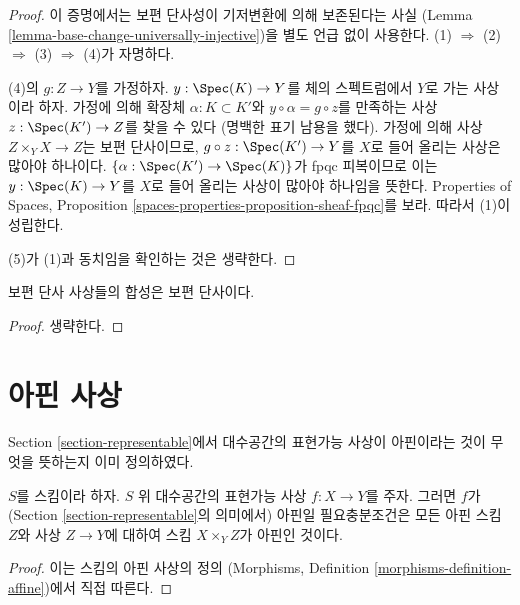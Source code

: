 \begin{proof}
이 증명에서는 보편 단사성이 기저변환에 의해 보존된다는 사실
(Lemma \ref{lemma-base-change-universally-injective})을 별도 언급 없이
사용한다. (1) $\Rightarrow$ (2) $\Rightarrow$ (3)
$\Rightarrow$ (4)가 자명하다.

\medskip\noindent
(4)의 $g : Z \to Y$를 가정하자. $y : \Spec(K) \to Y$를
체의 스펙트럼에서 $Y$로 가는 사상이라 하자. 가정에 의해
확장체 $\alpha : K \subset K'$와
$y \circ \alpha = g \circ z$를 만족하는 사상
$z : \Spec(K') \to Z$를 찾을 수 있다
(명백한 표기 남용을 했다). 가정에 의해 사상
$Z \times_Y X \to Z$는 보편 단사이므로,
$g \circ z : \Spec(K') \to Y$를 $X$로 들어 올리는 사상은
많아야 하나이다. $\{\alpha : \Spec(K') \to \Spec(K)\}$가
fpqc 피복이므로 이는
$y : \Spec(K) \to Y$를 $X$로 들어 올리는 사상이 많아야 하나임을
뜻한다. Properties of Spaces, Proposition
\ref{spaces-properties-proposition-sheaf-fpqc}를 보라.
따라서 (1)이 성립한다.

\medskip\noindent
(5)가 (1)과 동치임을 확인하는 것은 생략한다.
\end{proof}

\begin{lemma}
\label{lemma-composition-universally-injective}
보편 단사 사상들의 합성은 보편 단사이다.
\end{lemma}

\begin{proof}
생략한다.
\end{proof}

\section{아핀 사상}
\label{section-affine}

\noindent
Section \ref{section-representable}에서 대수공간의 표현가능 사상이
아핀이라는 것이 무엇을 뜻하는지 이미 정의하였다.

\begin{lemma}
\label{lemma-affine-representable}
$S$를 스킴이라 하자. $S$ 위 대수공간의 표현가능 사상
$f : X \to Y$를 주자. 그러면
$f$가 (Section \ref{section-representable}의 의미에서) 아핀일
필요충분조건은 모든 아핀 스킴 $Z$와 사상 $Z \to Y$에 대하여
스킴 $X \times_Y Z$가 아핀인 것이다.
\end{lemma}

\begin{proof}
이는 스킴의 아핀 사상의 정의
(Morphisms, Definition \ref{morphisms-definition-affine})에서
직접 따른다.
\end{proof}

